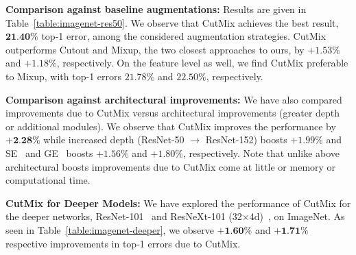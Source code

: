 

\noindent\textbf{Comparison against baseline augmentations: }
Results are given in Table~\ref{table:imagenet-res50}.
We observe that CutMix achieves the best result, {$\textbf{21.40\%}$} top-1 error, among the considered augmentation strategies.
CutMix outperforms Cutout and Mixup, the two closest approaches to ours, by $+1.53\%$ and $+1.18\%$, respectively.
On the feature level as well, we find CutMix preferable to Mixup, with top-1 errors $21.78\%$ and $22.50\%$, respectively.

\noindent\textbf{Comparison against architectural improvements: }
We have also compared improvements due to CutMix versus architectural improvements (\eg greater depth or additional modules). 
We observe that CutMix improves the performance by $\textbf{+2.28\%}$ while increased depth (ResNet-50 $\rightarrow$ ResNet-152) boosts $+1.99\%$ and SE~\cite{SENet} and GE~\cite{GENet} boosts $+1.56\%$ and $+1.80\%$, respectively.
Note that unlike above architectural boosts improvements due to CutMix come at little or memory or computational time.

\noindent\textbf{CutMix for Deeper Models: }
We have explored the performance of CutMix for the deeper networks, ResNet-101~\cite{resnet} and ResNeXt-101 (32$\times$4d)~\cite{resnext}, on ImageNet.
As seen in Table~\ref{table:imagenet-deeper}, we observe $ \textbf{+1.60\%}$ and $\textbf{+1.71\%}$ respective improvements in top-1 errors due to CutMix.
